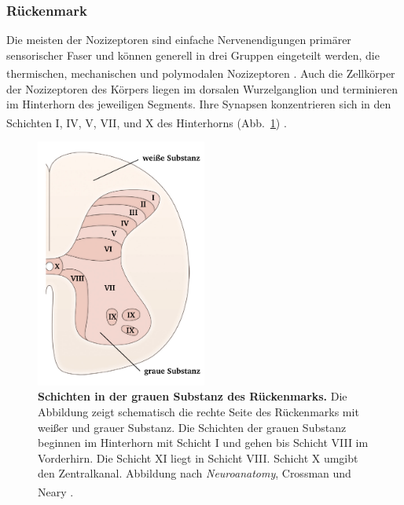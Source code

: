 \subsubsection*{Rückenmark}

Die meisten der Nozizeptoren  sind einfache Nervenendigungen primärer sensorischer Faser und können generell in drei Gruppen eingeteilt werden, die thermischen, mechanischen und polymodalen Nozizeptoren \textsuperscript{\cite[Kap.~24]{kandel2013principles}}. Auch die Zellkörper der Nozizeptoren des Körpers liegen im dorsalen Wurzelganglion und terminieren im Hinterhorn des jeweiligen Segments. Ihre Synapsen konzentrieren sich in den Schichten I, IV, V, VII, und X des Hinterhorns (Abb.~\ref{fig:graymatter}) \textsuperscript{\cite[Kap.~25]{paxinos2014rat}}.

\begin{figure}[H]
        \centering
        \includegraphics[width = 0.5\textwidth]
        {pictures/somatosensory/gray_matter.png}
        \caption[Schichten in der grauen Substanz des Rückenmarks]{\textbf{Schichten in der grauen Substanz des Rückenmarks.} Die Abbildung zeigt schematisch die rechte Seite des Rückenmarks mit weißer und grauer Substanz. Die Schichten der grauen Substanz beginnen im Hinterhorn mit Schicht I und gehen bis Schicht VIII im Vorderhirn. Die Schicht XI liegt in Schicht VIII. Schicht X umgibt den Zentralkanal. Abbildung nach \textit{Neuroanatomy}, Crossman und Neary
        \textsuperscript{\cite[Kap.~8]{crossman2014neuroanatomy}}.}
        \label{fig:graymatter}
    \end{figure}

